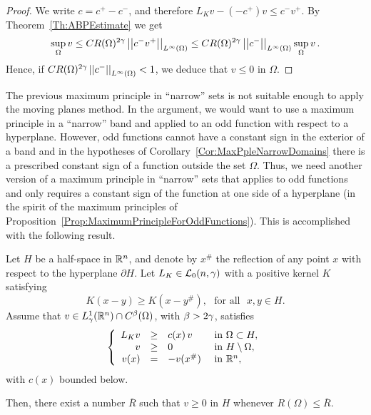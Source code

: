 \begin{proof}
	We write $c= c^+ - c^-$, and therefore $L_K v -(-c^+)v \leq c^- v^+	$. By Theorem~\ref{Th:ABPEstimate} we get
	$$
	\sup_\Omega v \leq C R(\Omega)^{2\gamma} \left | \left |{c^- v^+} \right | \right |_{L^\infty(\Omega)} \leq C R(\Omega)^{2\gamma} \left | \left |{c^-} \right | \right |_{L^\infty(\Omega)} \sup_\Omega v\,.
	$$
	Hence, if $C R(\Omega)^{2\gamma} \left | \left |{c^-} \right | \right |_{L^\infty(\Omega)}  <1 $, we deduce that $v\leq 0$ in $\Omega$.
\end{proof}


The previous maximum principle in ``narrow'' sets is not suitable enough to apply the moving planes method. In the argument, we would want to use a maximum principle in a ``narrow'' band and applied to an odd function with respect to a hyperplane. However, odd functions cannot have a constant sign in the exterior of a band and in the hypotheses of Corollary~\ref{Cor:MaxPpleNarrowDomains} there is a prescribed constant sign of a function outside the set $\Omega$. Thus, we need another version of a maximum principle in ``narrow'' sets that applies to odd functions and only requires a constant sign of the function at one side of a hyperplane (in the spirit of the maximum principles of Proposition~\ref{Prop:MaximumPrincipleForOddFunctions}). This is accomplished with the following result.

\begin{proposition}
	\label{Prop:MaxPrpNarrowOdd}
	Let $H$ be a half-space in $\mathbb{R}^n$, and denote by $x^\#$ the reflection of any point $x$ with respect to the hyperplane $\partial H$. Let $L_K \in \mathcal{L}_0(n,\gamma)$ with a positive kernel $K$ satisfying
	\begin{equation}
	\label{Eq:KernelSymmetry}
	K(x-y) \geq K(x-y^\#), \,\,\,\,\text{for all } \,\, x,y\in H.
	\end{equation}
	Assume that $v\in L^1_\gamma(\mathbb{R}^n)\cap C^{\beta}(\Omega)$, with $\beta > 2\gamma$, satisfies
	$$
	\left\{\begin{array}{rcll}
	L_K  v &\geq& c(x)\,v  &\textrm{ in } \Omega\subset H,\\
	v &\geq& 0 &\textrm{ in } H\setminus\Omega,\\
	v(x) &=& -v(x^\#) &\textrm{ in } \mathbb{R}^n,
	\end{array} \right.
	$$
	with $c(x)$ bounded below.
	
	Then, there exist a number $\overline{R}$ such that $v \geq 0$ in $H$ whenever $R(\Omega) \leq \overline{R}$.
\end{proposition}

